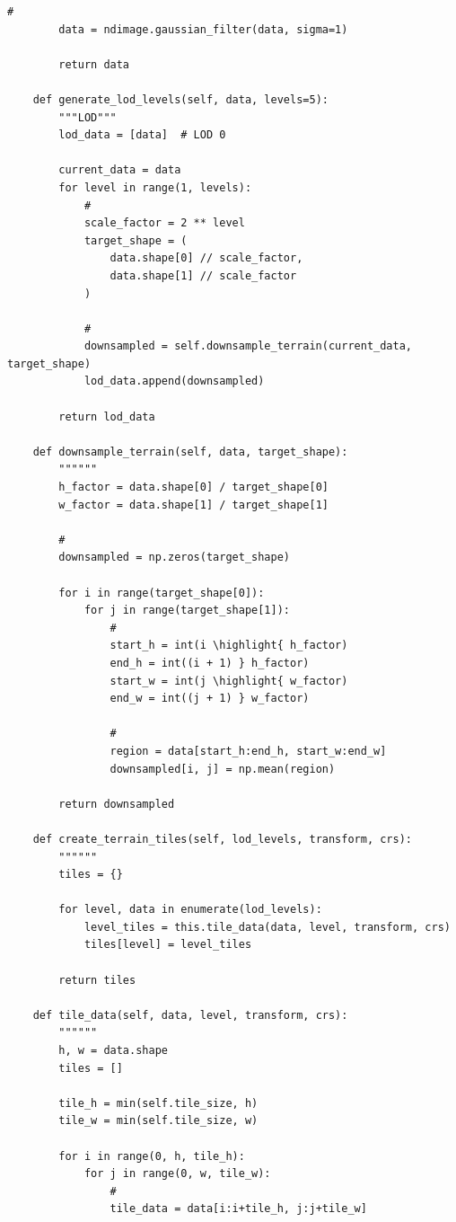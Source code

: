 \begin{lstlisting}[style=python]
        # 
        data = ndimage.gaussian_filter(data, sigma=1)
        
        return data
    
    def generate_lod_levels(self, data, levels=5):
        """LOD"""
        lod_data = [data]  # LOD 0 
        
        current_data = data
        for level in range(1, levels):
            # 
            scale_factor = 2 ** level
            target_shape = (
                data.shape[0] // scale_factor,
                data.shape[1] // scale_factor
            )
            
            # 
            downsampled = self.downsample_terrain(current_data, target_shape)
            lod_data.append(downsampled)
            
        return lod_data
    
    def downsample_terrain(self, data, target_shape):
        """"""
        h_factor = data.shape[0] / target_shape[0]
        w_factor = data.shape[1] / target_shape[1]
        
        # 
        downsampled = np.zeros(target_shape)
        
        for i in range(target_shape[0]):
            for j in range(target_shape[1]):
                # 
                start_h = int(i \highlight{ h_factor)
                end_h = int((i + 1) } h_factor)
                start_w = int(j \highlight{ w_factor)
                end_w = int((j + 1) } w_factor)
                
                # 
                region = data[start_h:end_h, start_w:end_w]
                downsampled[i, j] = np.mean(region)
        
        return downsampled
    
    def create_terrain_tiles(self, lod_levels, transform, crs):
        """"""
        tiles = {}
        
        for level, data in enumerate(lod_levels):
            level_tiles = this.tile_data(data, level, transform, crs)
            tiles[level] = level_tiles
            
        return tiles
    
    def tile_data(self, data, level, transform, crs):
        """"""
        h, w = data.shape
        tiles = []
        
        tile_h = min(self.tile_size, h)
        tile_w = min(self.tile_size, w)
        
        for i in range(0, h, tile_h):
            for j in range(0, w, tile_w):
                # 
                tile_data = data[i:i+tile_h, j:j+tile_w]
                

\end{lstlisting}
